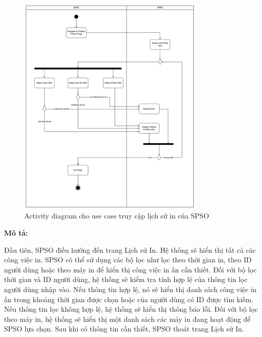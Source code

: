 \begin{figure}[H]
    \begin{center}
        \includegraphics[width=0.8\textwidth]{Images/System Modelling/Logging(SPSO)_Activity.png}
        \caption{Activity diagram cho use case truy cập lịch sử in của SPSO}
        \label{fig:arch}
    \end{center}
\end{figure}

\textbf{Mô tả:}\par
Đầu tiên, SPSO điều hướng đến trang Lịch sử In. Hệ thống sẽ hiển thị tất cả các công việc in. SPSO có thể sử dụng các bộ lọc như lọc theo thời gian in, theo ID người dùng hoặc theo máy in để hiển thị công việc in ấn cần thiết. Đối với bộ lọc thời gian và ID người dùng, hệ thống sẽ kiểm tra tính hợp lệ của thông tin lọc người dùng nhập vào. Nếu thông tin hợp lệ, nó sẽ hiển thị danh sách công việc in ấn trong khoảng thời gian được chọn hoặc của người dùng có ID được tìm kiếm. Nếu thông tin lọc không hợp lệ, hệ thống sẽ hiển thị thông báo lỗi. Đối với bộ lọc theo máy in, hệ thống sẽ hiển thị một danh sách các máy in đang hoạt động để SPSO lựa chọn. Sau khi có thông tin cần thiết, SPSO thoát trang Lịch sử In.
